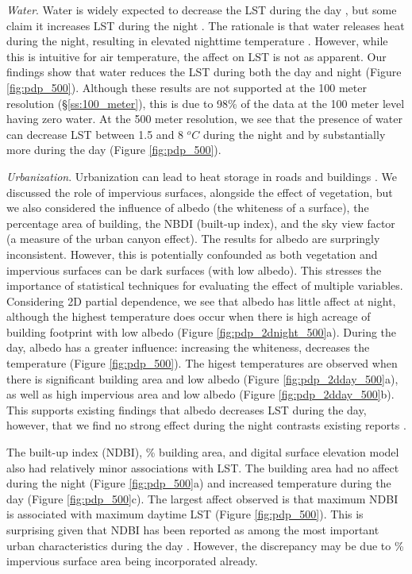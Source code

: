 \documentclass[final,3p,times,twocolumn,sort&compress]{elsarticle}
\begin{document}
\textit{Water}.
Water is widely expected to decrease the LST during the day \cite{Wicki2017-fv, Zhou2018-iy, Wang2019-water}, but some claim it increases LST during the night \cite{Chun2017-mm}.
The rationale is that water releases heat during the night, resulting in elevated nighttime temperature \cite{Chun2017-mm}.
However, while this is intuitive for air temperature, the affect on LST is not as apparent.
Our findings show that water reduces the LST during both the day and night (Figure \ref{fig:pdp_500}).
Although these results are not supported at the 100 meter resolution (\S \ref{ss:100_meter}), this is due to 98\% of the data at the 100 meter level having zero water.
At the 500 meter resolution, we see that the presence of water can decrease LST between 1.5 and 8 $^oC$ during the night and by substantially more during the day (Figure \ref{fig:pdp_500}).

\textit{Urbanization}.
Urbanization can lead to heat storage in roads and buildings \cite{Zhou2014-wc, Voogt2003-mm}. 
We discussed the role of impervious surfaces, alongside the effect of vegetation, but we also considered the influence of albedo (the whiteness of a surface), the percentage area of building, the NBDI (built-up index), and the sky view factor (a measure of the urban canyon effect).
The results for albedo are surpringly inconsistent.
However, this is potentially confounded as both vegetation and impervious surfaces can be dark surfaces (with low albedo).
This stresses the importance of statistical techniques for evaluating the effect of multiple variables.
Considering 2D partial dependence, we see that albedo has little affect at night, although the highest temperature does occur when there is high acreage of building footprint with low albedo (Figure \ref{fig:pdp_2dnight_500}a).
During the day, albedo has a greater influence: increasing the whiteness, decreases the temperature (Figure \ref{fig:pdp_500}).
The higest temperatures are observed when there is significant building area and low albedo (Figure \ref{fig:pdp_2dday_500}a), as well as high impervious area and low albedo (Figure \ref{fig:pdp_2dday_500}b).
This supports existing findings that albedo decreases LST during the day, however, that we find no strong effect during the night contrasts existing reports \cite{Peng2012-iy, Zhou2014-wc}.

The built-up index (NDBI), \% building area, and digital surface elevation model also had relatively minor associations with LST.
The building area had no affect during the night (Figure \ref{fig:pdp_500}a) and increased temperature during the day (Figure \ref{fig:pdp_500}c).
The largest affect observed is that maximum NDBI is associated with maximum daytime LST (Figure \ref{fig:pdp_500}).
This is surprising given that NDBI has been reported as among the most important urban characteristics during the day \cite{Peng2018-cp}.
However, the discrepancy may be due to \% impervious surface area being incorporated already.
\end{document}
